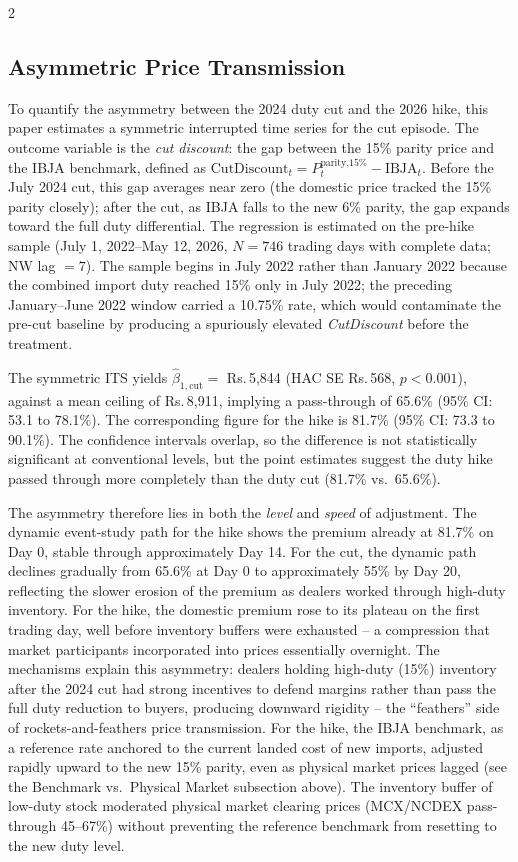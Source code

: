 \documentclass[12pt]{article}
\begin{document}
\begin{multicols}{2}

\subsection*{Asymmetric Price Transmission}

To quantify the asymmetry between the 2024 duty cut and the 2026 hike, this paper estimates a symmetric interrupted time series for the cut episode. The outcome variable is the \emph{cut discount}: the gap between the 15\% parity price and the IBJA benchmark, defined as $\text{CutDiscount}_t = P^{\text{parity,15\%}}_t - \text{IBJA}_t$. Before the July 2024 cut, this gap averages near zero (the domestic price tracked the 15\% parity closely); after the cut, as IBJA falls to the new 6\% parity, the gap expands toward the full duty differential. The regression is estimated on the pre-hike sample (July 1, 2022--May 12, 2026, $N = 746$ trading days with complete data; NW lag $= 7$). The sample begins in July 2022 rather than January 2022 because the combined import duty reached 15\% only in July 2022; the preceding January--June 2022 window carried a 10.75\% rate, which would contaminate the pre-cut baseline by producing a spuriously elevated \emph{CutDiscount} before the treatment.

The symmetric ITS yields $\hat{\beta}_{1,\text{cut}} = $ Rs.\,5,844 (HAC SE Rs.\,568, $p < 0.001$), against a mean ceiling of Rs.\,8,911, implying a pass-through of 65.6\% (95\% CI: 53.1 to 78.1\%). The corresponding figure for the hike is 81.7\% (95\% CI: 73.3 to 90.1\%). The confidence intervals overlap, so the difference is not statistically significant at conventional levels, but the point estimates suggest the duty hike passed through more completely than the duty cut (81.7\% vs.\ 65.6\%).

The asymmetry therefore lies in both the \emph{level} and \emph{speed} of adjustment. The dynamic event-study path for the hike shows the premium already at 81.7\% on Day 0, stable through approximately Day 14. For the cut, the dynamic path declines gradually from 65.6\% at Day 0 to approximately 55\% by Day 20, reflecting the slower erosion of the premium as dealers worked through high-duty inventory. For the hike, the domestic premium rose to its plateau on the first trading day, well before inventory buffers were exhausted -- a compression that market participants incorporated into prices essentially overnight. The mechanisms explain this asymmetry: dealers holding high-duty (15\%) inventory after the 2024 cut had strong incentives to defend margins rather than pass the full duty reduction to buyers, producing downward rigidity -- the ``feathers'' side of rockets-and-feathers price transmission. For the hike, the IBJA benchmark, as a reference rate anchored to the current landed cost of new imports, adjusted rapidly upward to the new 15\% parity, even as physical market prices lagged (see the Benchmark vs.~Physical Market subsection above). The inventory buffer of low-duty stock moderated physical market clearing prices (MCX/NCDEX pass-through 45--67\%) without preventing the reference benchmark from resetting to the new duty level.


\end{multicols}
\end{document}
